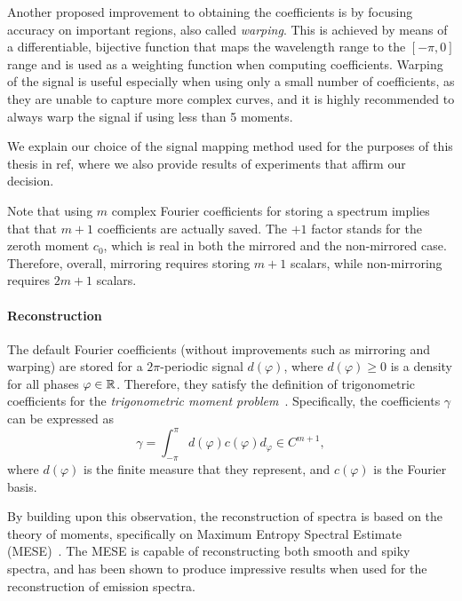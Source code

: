 Another proposed improvement to obtaining the coefficients is by focusing accuracy on important regions, also called \emph{warping}. This is achieved by means of a differentiable, bijective function that maps the wavelength range to the $[-\pi, 0]$ range and is used as a weighting function when computing coefficients. Warping of the signal is useful especially when using only a small number of coefficients, as they are unable to capture more complex curves, and it is highly recommended to always warp the signal if using less than 5 moments.

We explain our choice of the signal mapping method used for the purposes of this thesis in ref, where we also provide results of experiments that affirm our decision.

Note that using $m$ complex Fourier coefficients for storing a spectrum implies that that $m+1$ coefficients are actually saved. The $+1$ factor stands for the zeroth moment $c_0$, which is real in both the mirrored and the non-mirrored case. Therefore, overall, mirroring requires storing $m+1$ scalars, while non-mirroring requires $2m+1$ scalars.

\paragraph{Reconstruction} 

The default Fourier coefficients (without improvements such as mirroring and warping) are stored for a $2\pi$-periodic signal $d(\varphi)$, where $d(\varphi) \ge 0$ is a density for all phases $\varphi \in \mathbb{R}$. Therefore, they satisfy the definition of trigonometric coefficients for the \emph{trigonometric moment problem}~\cite{trigonometricMomentProblemDefiniton}. Specifically, the coefficients $\gamma$ can be expressed as
\begin{equation} \label{trigonometricCoeffsComputation}
\gamma = \int_{-\pi}^{\pi} d(\varphi) c(\varphi)d_\varphi \in C^{m+1},
\end{equation}
where $d(\varphi)$ is the finite measure that they represent, and $c(\varphi)$ is the Fourier basis.

By building upon this observation, the reconstruction of spectra is based on the theory of moments, specifically on Maximum Entropy Spectral Estimate (MESE)~\cite{unboundedMESEoriginal}. The MESE is capable of reconstructing both smooth and spiky spectra, and has been shown to produce impressive results when used for the reconstruction of emission spectra.

